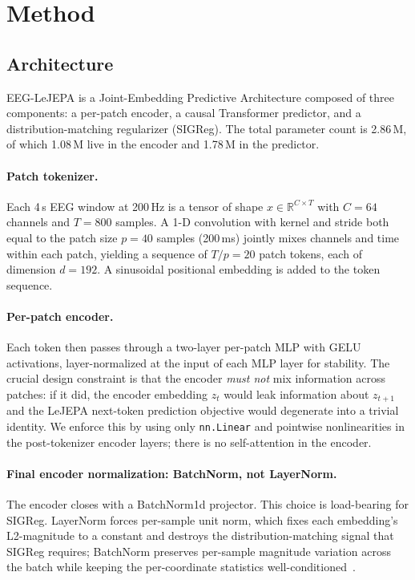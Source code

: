 \section{Method}
\label{sec:method}

\subsection{Architecture}
\label{sec:method:arch}

EEG-LeJEPA is a Joint-Embedding Predictive Architecture composed of three
components: a per-patch encoder, a causal Transformer predictor, and a
distribution-matching regularizer (SIGReg). The total parameter count is
2.86\,M, of which 1.08\,M live in the encoder and 1.78\,M in the predictor.

\paragraph{Patch tokenizer.}
Each 4\,s EEG window at 200\,Hz is a tensor of shape
$x \in \mathbb{R}^{C \times T}$ with $C{=}64$ channels and $T{=}800$ samples. A
1-D convolution with kernel and stride both equal to the patch size
$p{=}40$ samples (200\,ms) jointly mixes channels and time within each patch,
yielding a sequence of $T/p{=}20$ patch tokens, each of dimension $d{=}192$.
A sinusoidal positional embedding is added to the token sequence.

\paragraph{Per-patch encoder.}
Each token then passes through a two-layer per-patch MLP with GELU
activations, layer-normalized at the input of each MLP layer for stability.
The crucial design constraint is that the encoder \emph{must not} mix
information across patches: if it did, the encoder embedding $z_t$ would
leak information about $z_{t+1}$ and the LeJEPA next-token prediction
objective would degenerate into a trivial identity. We enforce this by
using only \texttt{nn.Linear} and pointwise nonlinearities in the
post-tokenizer encoder layers; there is no self-attention in the encoder.

\paragraph{Final encoder normalization: BatchNorm, not LayerNorm.}
The encoder closes with a BatchNorm1d projector. This choice is load-bearing
for SIGReg. LayerNorm forces per-sample unit norm, which fixes each
embedding's L2-magnitude to a constant and destroys the distribution-matching
signal that SIGReg requires; BatchNorm preserves per-sample magnitude
variation across the batch while keeping the per-coordinate statistics
well-conditioned~\cite[App.~A]{lewm2026}.

